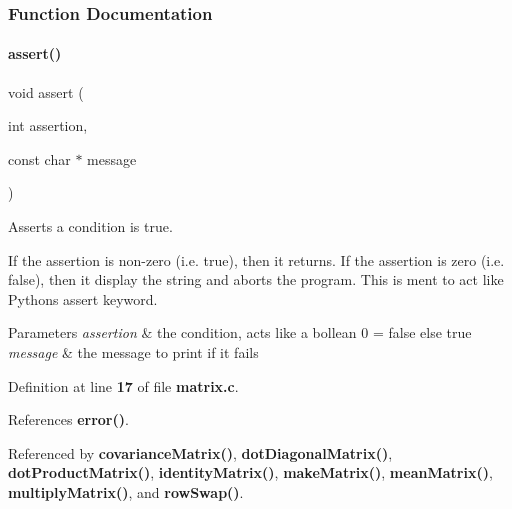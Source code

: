 \subsubsection{Function Documentation}
\mbox{\label{matrix_8c_a8e41e30382335ea89f90b72db0b44d6f}} 
\paragraph{assert()}
{\footnotesize\ttfamily void assert (\begin{DoxyParamCaption}\item[{int}]{assertion,  }\item[{const char $\ast$}]{message }\end{DoxyParamCaption})}



Asserts a condition is true. 

If the assertion is non-\/zero (i.\+e. true), then it returns. If the assertion is zero (i.\+e. false), then it display the string and aborts the program. This is ment to act like Python\textquotesingle{}s assert keyword. 
\begin{DoxyParams}{Parameters}
{\em assertion} & the condition, acts like a bollean 0 = false else true \\
\hline
{\em message} & the message to print if it fails \\
\hline
\end{DoxyParams}


Definition at line \textbf{ 17} of file \textbf{ matrix.\+c}.



References \textbf{ error()}.



Referenced by \textbf{ covariance\+Matrix()}, \textbf{ dot\+Diagonal\+Matrix()}, \textbf{ dot\+Product\+Matrix()}, \textbf{ identity\+Matrix()}, \textbf{ make\+Matrix()}, \textbf{ mean\+Matrix()}, \textbf{ multiply\+Matrix()}, and \textbf{ row\+Swap()}.


